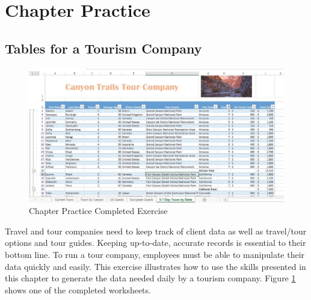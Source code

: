 \section{Chapter Practice}

\subsection{Tables for a Tourism Company}

\begin{figure}[H]
	\centering
	\includegraphics[width=\maxwidth{.95\linewidth}]{gfx/ch05_fig30}
	\caption{Chapter Practice Completed Exercise}
	\label{05:fig30}
\end{figure}

Travel and tour companies need to keep track of client data as well as travel/tour options and tour guides. Keeping up-to-date, accurate records is essential to their bottom line. To run a tour company, employees must be able to manipulate their data quickly and easily. This exercise illustrates how to use the skills presented in this chapter to generate the data needed daily by a tourism company. Figure \ref{05:fig30} shows one of the completed worksheets.

